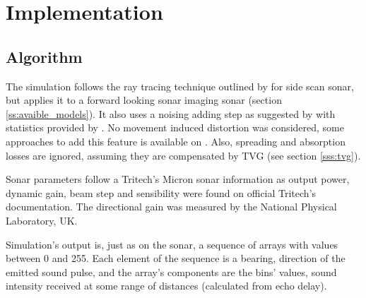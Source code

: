 
\section{Implementation}

\subsection{Algorithm}
\label{ss:algorithm}

The simulation follows the ray tracing technique outlined by
\citet{bell1997simulation} for side scan sonar, but applies it to a forward
looking sonar imaging sonar (section \ref{ss:avaible_models}). It also uses a
noising adding step as suggested by \citet{coiras2009gpu} with statistics
provided by \citet{maussang2007mean}.
No movement induced distortion was considered, some approaches to add this
feature is available on \citet{bell1999techniques,borawski2005sonar}. Also,
spreading and absorption losses are ignored, assuming they are compensated by
TVG (see section \ref{sss:tvg}).

Sonar parameters follow a Tritech's Micron sonar\cite{micronsonar}
information as output power, dynamic gain, beam step and sensibility were found
on official Tritech's documentation\cite{micronsonar,micronmodem}. The directional
gain was measured by the National Physical Laboratory, UK.

Simulation's output is, just as on the sonar, a sequence of arrays with values
between 0 and 255. Each element of the sequence is a bearing, direction of the
emitted sound pulse, and the array's components are the bins' values, sound
intensity received at some range of distances (calculated from echo delay).

